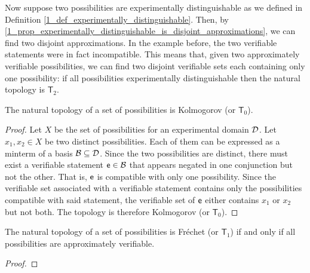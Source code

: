 \documentclass[11pt,letterpaper,fleqn]{memoir} %
\begin{document}
Now suppose two possibilities are experimentally distinguishable as we defined in Definition \ref{1_def_experimentally_distinguishable}. Then, by \ref{1_prop_experimentally_distinguishable_is_disjoint_approximations}, we can find two disjoint approximations. In the example before, the two verifiable statements were in fact incompatible. This means that, given two approximately verifiable possibilities, we can find two disjoint verifiable sets each containing only one possibility: if all possibilities experimentally distinguishable then the natural topology is $\mathsf{T}_2$.

\begin{mathSection}
	\begin{prop}
	The natural topology of a set of possibilities is Kolmogorov (or $\mathsf{T}_0$).
\end{prop}
\begin{proof}
	Let $X$ be the set of possibilities for an experimental domain $\edomain$. Let $x_1, x_2 \in X$ be two distinct possibilities. Each of them can be expressed as a minterm of a basis $\basis \subseteq \edomain$. Since the two possibilities are distinct, there must exist a verifiable statement $\obs[e] \in \basis$ that appears negated in one conjunction but not the other. That is, $\obs[e]$ is compatible with only one possibility. Since the verifiable set associated with a verifiable statement contains only the possibilities compatible with said statement, the verifiable set of $\obs[e]$ either contains $x_1$ or $x_2$ but not both. The topology is therefore Kolmogorov (or $\mathsf{T}_0$).
\end{proof}
\begin{prop}
	The natural topology of a set of possibilities is Fr\'echet (or $\mathsf{T}_1$) if and only if all possibilities are approximately verifiable.
\end{prop}
\begin{proof}

\end{proof}
\end{mathSection}
\end{document}
